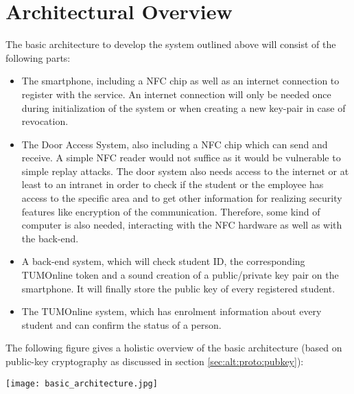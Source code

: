 \section{Architectural Overview}\label{sec:arch}

The basic architecture to develop the system outlined above will consist of the following parts:

\begin{itemize}
\item The smartphone, including a NFC chip as well as an internet connection to register with the service.
An internet connection will only be needed once during initialization of the system or when creating a new key-pair in case of revocation.
\item The Door Access System, also including a NFC chip which can send and receive.
A simple NFC reader would not suffice as it would be vulnerable to simple replay attacks.
The door system also needs access to the internet or at least to an intranet in order to check if the student or the employee has access to the specific area and to get other information for realizing security features like encryption of the communication. Therefore, some kind of computer is also needed, interacting with the NFC hardware as well as with the back-end.
\item A back-end system, which will check student ID, the corresponding TUMOnline token and a sound creation of a public/private key pair on the smartphone. It will finally store the public key of every registered student.

\item The TUMOnline system, which has enrolment information about every student and can confirm the status of a person.
\end{itemize} 
%
The following figure gives a holistic overview of the basic architecture (based on public-key cryptography as discussed in section \ref{sec:alt:proto:pubkey}): \newline
 \begin{center}
	\texttt{[image: basic\_architecture.jpg]}
\end{center}


